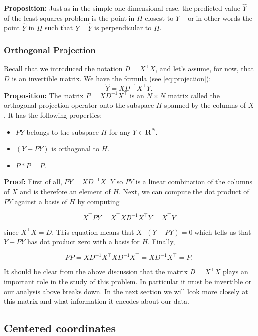 \documentclass[]{article}
\providecommand{\tightlist}{%
  \setlength{\itemsep}{0pt}\setlength{\parskip}{0pt}}
\begin{document}
\textbf{Proposition:} Just as in the simple one-dimensional case, the
predicted value \(\hat{Y}\) of the least squares problem is the point in
\(H\) closest to \(Y\) -- or in other words the point \(\hat{Y}\) in
\(H\) such that \(Y-\hat{Y}\) is perpendicular to \(H\).

\hypertarget{orthogonal-projection}{%
\subsubsection{Orthogonal Projection}\label{orthogonal-projection}}

Recall that we introduced the notation \(D=X^{\intercal}X\), and let's
assume, for now, that \(D\) is an invertible matrix. We have the formula
(see \cref{eq:projection}): \[ \hat{Y} = XD^{-1}X^{\intercal}Y.  \]
\textbf{Proposition:} The matrix \(P=XD^{-1}X^{\intercal}\) is an
\(N\times N\) matrix called the orthogonal projection operator onto the
subspace \(H\) spanned by the columns of \(X\). It has the following
properties:

\begin{itemize}
\tightlist
\item
  \(PY\) belongs to the subspace \(H\) for any \(Y\in\mathbf{R}^{N}\).
\item
  \((Y-PY)\) is orthogonal to \(H\).
\item
  \(P*P = P\).
\end{itemize}

\textbf{Proof:} First of all, \(PY=XD^{-1}X^{\intercal}Y\) so \(PY\) is
a linear combination of the columns of \(X\) and is therefore an element
of \(H\). Next, we can compute the dot product of \(PY\) against a basis
of \(H\) by computing

\[ X^{\intercal}PY = X^{\intercal}XD^{-1}X^{\intercal}Y =
X^{\intercal}Y \]

since \(X^{\intercal}X=D\). This equation means that
\(X^{\intercal}(Y-PY)=0\) which tells us that \(Y-PY\) has dot product
zero with a basis for \(H\). Finally,

\[ PP = XD^{-1}X^{\intercal}XD^{-1}X^{\intercal} =
XD^{-1}X^{\intercal}=P.  \]

It should be clear from the above discussion that the matrix
\(D=X^{\intercal}X\) plays an important role in the study of this
problem. In particular it must be invertible or our analysis above
breaks down. In the next section we will look more closely at this
matrix and what information it encodes about our data.

\hypertarget{sec:centered}{%
\subsection{Centered coordinates}\label{sec:centered}}
\end{document}
